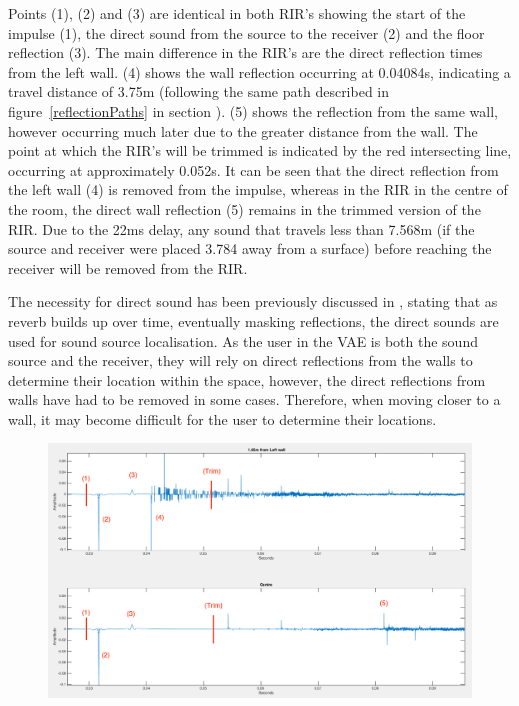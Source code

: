 \documentclass[../../main.tex]{subfiles}
\begin{document}
		Points (1), (2) and (3) are identical in both \ac{RIR}'s showing the start of the impulse (1), the direct sound from the source to the receiver (2) and the floor reflection (3). The main difference in the \ac{RIR}'s are the direct reflection times from the left wall. (4) shows the wall reflection occurring at 0.04084s, indicating a travel distance of 3.75m (following the same path described in figure~\ref{reflectionPaths} in section ). (5) shows the reflection from the same wall, however occurring much later due to the greater distance from the wall. The point at which the \ac{RIR}'s will be trimmed is indicated by the red intersecting line, occurring at approximately 0.052s. It can be seen that the direct reflection from the left wall (4) is removed from the impulse, whereas in the \ac{RIR} in the centre of the room, the direct wall reflection (5) remains in the trimmed version of the \ac{RIR}. Due to the 22ms delay, any sound that travels less than 7.568m (if the source and receiver were placed 3.784 away from a surface) before reaching the receiver will be removed from the \ac{RIR}. 

		The necessity for direct sound has been previously discussed in \cite{Devore2009}, stating that as reverb builds up over time, eventually masking reflections, the direct sounds are used for sound source localisation. As the user in the \ac{VAE} is both the sound source and the receiver, they will rely on direct reflections from the walls to determine their location within the space, however, the direct reflections from walls have had to be removed in some cases. Therefore, when moving closer to a wall, it may become difficult for the user to determine their locations.

		\begin{figure}
			\centerline{\includegraphics[width=\textwidth]{Sections/Implementation/Max/images/Latency/odeonLatency_edit.png}}
			\caption{}
			\label{odeonTrim}
		\end{figure}
\end{document}
